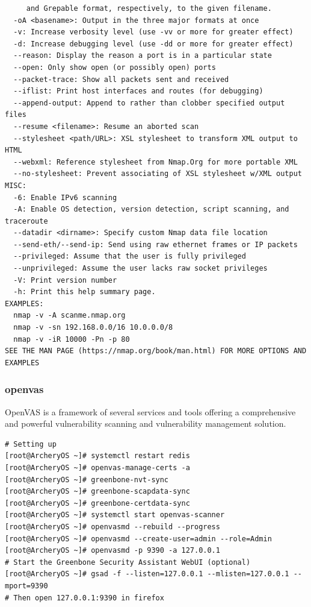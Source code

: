 \documentclass{article}
\begin{document}
\begin{lstlisting}
     and Grepable format, respectively, to the given filename.
  -oA <basename>: Output in the three major formats at once
  -v: Increase verbosity level (use -vv or more for greater effect)
  -d: Increase debugging level (use -dd or more for greater effect)
  --reason: Display the reason a port is in a particular state
  --open: Only show open (or possibly open) ports
  --packet-trace: Show all packets sent and received
  --iflist: Print host interfaces and routes (for debugging)
  --append-output: Append to rather than clobber specified output files
  --resume <filename>: Resume an aborted scan
  --stylesheet <path/URL>: XSL stylesheet to transform XML output to HTML
  --webxml: Reference stylesheet from Nmap.Org for more portable XML
  --no-stylesheet: Prevent associating of XSL stylesheet w/XML output
MISC:
  -6: Enable IPv6 scanning
  -A: Enable OS detection, version detection, script scanning, and traceroute
  --datadir <dirname>: Specify custom Nmap data file location
  --send-eth/--send-ip: Send using raw ethernet frames or IP packets
  --privileged: Assume that the user is fully privileged
  --unprivileged: Assume the user lacks raw socket privileges
  -V: Print version number
  -h: Print this help summary page.
EXAMPLES:
  nmap -v -A scanme.nmap.org
  nmap -v -sn 192.168.0.0/16 10.0.0.0/8
  nmap -v -iR 10000 -Pn -p 80
SEE THE MAN PAGE (https://nmap.org/book/man.html) FOR MORE OPTIONS AND EXAMPLES
\end{lstlisting}

\subsubsection{openvas}
OpenVAS is a framework of several services and tools offering a comprehensive and powerful vulnerability scanning and vulnerability management solution.
\begin{lstlisting}
# Setting up
[root@ArcheryOS ~]# systemctl restart redis
[root@ArcheryOS ~]# openvas-manage-certs -a
[root@ArcheryOS ~]# greenbone-nvt-sync
[root@ArcheryOS ~]# greenbone-scapdata-sync
[root@ArcheryOS ~]# greenbone-certdata-sync
[root@ArcheryOS ~]# systemctl start openvas-scanner
[root@ArcheryOS ~]# openvasmd --rebuild --progress
[root@ArcheryOS ~]# openvasmd --create-user=admin --role=Admin
[root@ArcheryOS ~]# openvasmd -p 9390 -a 127.0.0.1
# Start the Greenbone Security Assistant WebUI (optional) 
[root@ArcheryOS ~]# gsad -f --listen=127.0.0.1 --mlisten=127.0.0.1 --mport=9390
# Then open 127.0.0.1:9390 in firefox
\end{lstlisting}
\end{document}
